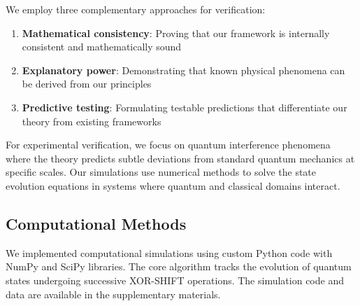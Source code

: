 We employ three complementary approaches for verification:

\begin{enumerate}
    \item \textbf{Mathematical consistency}: Proving that our framework is internally consistent and mathematically sound
    \item \textbf{Explanatory power}: Demonstrating that known physical phenomena can be derived from our principles
    \item \textbf{Predictive testing}: Formulating testable predictions that differentiate our theory from existing frameworks
\end{enumerate}

For experimental verification, we focus on quantum interference phenomena where the theory predicts subtle deviations from standard quantum mechanics at specific scales. Our simulations use numerical methods to solve the state evolution equations in systems where quantum and classical domains interact.

\subsection{Computational Methods}

We implemented computational simulations using custom Python code with NumPy and SciPy libraries. The core algorithm tracks the evolution of quantum states undergoing successive XOR-SHIFT operations. The simulation code and data are available in the supplementary materials.
